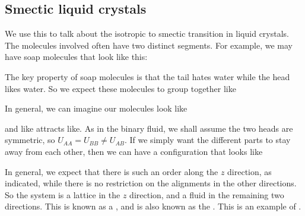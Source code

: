 \documentclass[a4paper]{article}
\begin{document}
\subsection{Smectic liquid crystals}
We use this to talk about the isotropic to smectic transition in liquid crystals. The molecules involved often have two distinct segments. For example, we may have soap molecules that look like this:
\begin{center}
\end{center}
The key property of soap molecules is that the tail hates water while the head likes water. So we expect these molecules to group together like
\begin{center}
\end{center}
In general, we can imagine our molecules look like
\begin{center}
\end{center}
and like attracts like. As in the binary fluid, we shall assume the two heads are symmetric, so $U_{AA} = U_{BB} \not= U_{AB}$. If we simply want the different parts to stay away from each other, then we can have a configuration that looks like
\begin{center}
\end{center}
In general, we expect that there is such an order along the $z$ direction, as indicated, while there is no restriction on the alignments in the other directions. So the system is a lattice in the $z$ direction, and a fluid in the remaining two directions. This is known as a , and is also known as the . This is an example of .
\end{document}
